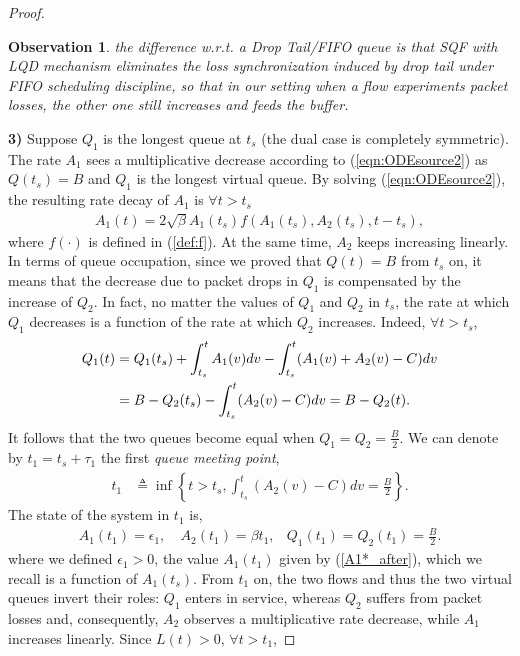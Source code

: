 \documentclass[a4paper,oneside, 11pt]{article}
\newtheorem{obs}[theorem]{Observation}
\begin{document}
\begin{proof}
\begin{obs}
the difference w.r.t. a Drop Tail/FIFO queue is that SQF with LQD  mechanism eliminates the loss synchronization induced by drop tail under FIFO scheduling discipline, so that in our setting when a flow experiments packet losses, the other one still increases and feeds the buffer.
\end{obs}\textbf{3)}
Suppose $Q_1$ is the longest queue at $t_s$ (the dual case is completely symmetric).
The rate $A_1$ sees a multiplicative decrease according to (\ref{eqn:ODEsource2})
as $Q(t_s)=B$ and $Q_1$ is the longest virtual queue. By solving (\ref{eqn:ODEsource2}), the resulting rate decay of $A_1$ is $\forall t>t_s$
\begin{align}\label{A1*_after}
A_1(t)=2\sqrt{\beta}A_1(t_s)f(A_1(t_s),A_2(t_s),t-t_s),
\end{align}
where $f(\cdot)$ is defined in (\ref{def:f}).
At the same time, $A_2$ keeps increasing linearly.
In terms of queue occupation, since we proved that $Q(t)=B$ from $t_s$ on, it means that the decrease
due to packet drops in $Q_1$  is compensated by
the increase of $Q_2$.
In fact, no matter the values of $Q_1$ and $Q_2$ in $t_s$, the rate at which $Q_1$ decreases is a function of the rate at which $Q_2$ increases.
Indeed, $\forall t>t_s$,\begin{align*}
 Q_1(t)&= Q_1(t_s)+\int_{t_s}^{t} A_1(v)dv-\int_{t_s}^{t} (A_1(v)+A_2(v)-C)dv \nonumber\\
\vspace{-1mm}  &=B-Q_2(t_s)-\int_{t_s}^{t} (A_2(v)-C)dv =B- Q_2(t).
\end{align*}
It follows that the two queues become equal when $Q_1=Q_2=\frac{B}{2}$.
We can denote by $t_1=t_s+\tau_1$ the first \textit{queue meeting point},
\begin{align}\label{def:t1}
t_1 &\triangleq  \inf\left \{ t>t_s, \int_{t_s}^{t} (A_2(v)-C) dv=\frac{B}{2} \right \}.\end{align}
The state of the system in $t_1$ is,
\begin{align}\label{ic_t1}
A_1(t_1)= \epsilon_1, &~ A_2(t_1)= \beta t_1, & Q_1(t_1)=Q_2(t_1)=\frac{B}{2}.
\end{align}
where we defined $\epsilon_1>0$, the value $A_1(t_1)$ given by (\ref{A1*_after}), which we recall is a function of $A_1(t_s)$.
From $t_1$ on, the two flows and thus the two virtual queues invert their roles: $Q_1$ enters in service, whereas $Q_2$ suffers from packet losses and, consequently, $A_2$ observes a multiplicative rate decrease, while $A_1$ increases linearly.
Since $L(t)>0$, $\forall t>t_1$,

\end{proof}
\end{document}
